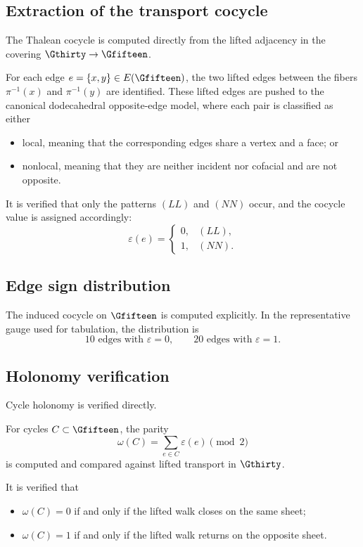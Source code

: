 \subsection{Extraction of the transport cocycle}

The Thalean cocycle is computed directly from the lifted adjacency in
the covering $\Gthirty \to \Gfifteen$.

For each edge $e=\{x,y\}\in E(\Gfifteen)$, the two lifted edges between
the fibers $\pi^{-1}(x)$ and $\pi^{-1}(y)$ are identified. These lifted
edges are pushed to the canonical dodecahedral opposite-edge model,
where each pair is classified as either

\begin{itemize}
\item local, meaning that the corresponding edges share a vertex and a face; or
\item nonlocal, meaning that they are neither incident nor cofacial and are not opposite.
\end{itemize}

It is verified that only the patterns $(LL)$ and $(NN)$ occur, and the
cocycle value is assigned accordingly:
\[
\varepsilon(e)=
\begin{cases}
0,&(LL),\\
1,&(NN).
\end{cases}
\]

\subsection{Edge sign distribution}

The induced cocycle on $\Gfifteen$ is computed explicitly. In the
representative gauge used for tabulation, the distribution is
\[
10 \text{ edges with } \varepsilon=0,\qquad
20 \text{ edges with } \varepsilon=1.
\]

\subsection{Holonomy verification}

Cycle holonomy is verified directly.

For cycles $C\subset \Gfifteen$, the parity
\[
\omega(C)=\sum_{e\in C}\varepsilon(e)\pmod 2
\]
is computed and compared against lifted transport in $\Gthirty$.

It is verified that
\begin{itemize}
\item $\omega(C)=0$ if and only if the lifted walk closes on the same sheet;
\item $\omega(C)=1$ if and only if the lifted walk returns on the opposite sheet.
\end{itemize}

